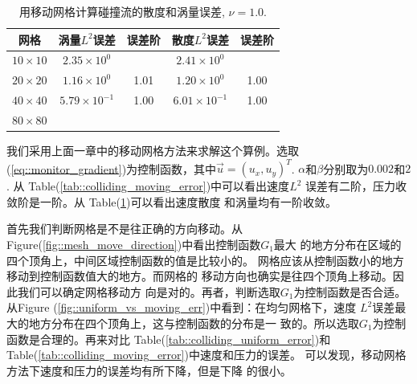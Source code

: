 \documentclass{report}
\theoremstyle{Remark}
\begin{document}
          \begin{table}[!htbp]
            \centering
            \begin{tabular}{ccccc} \toprule
              网格   & 涡量$L^2$误差 & 误差阶 & 散度$L^2$误差 & 误差阶\\ \midrule
              $10 \times 10$    &   $2.35 \times 10^{0}$   &  &   $2.41 \times
              10^0$ &  \\
              $20 \times 20 $   &   $1.16 \times 10^{0}$  & 1.01  &   $1.20 \times
              10^0$ & 1.00 \\
              $40 \times 40 $   &   $5.79 \times 10^{-1}$ & 1.00  &   $6.01 \times
              10^{-1}$ &  1.00 \\
              $80 \times 80 $   &  &   & &  \\ \bottomrule
            \end{tabular}
            \caption{\small 用移动网格计算碰撞流的散度和涡量误差, $\nu = 1.0$.}
            \label{tab::colliding_moving_div_error}
          \end{table}

          我们采用上面一章中的移动网格方法来求解这个算例。选取
          (\ref{eq::monitor_gradient})为控制函数，其中$\vec{u} = (u_x,
          u_y)^T$. $\alpha$和$\beta$分别取为$0.002$和$2$. 从
          Table(\ref{tab::colliding_moving_error})中可以看出速度$L^2$
          误差有二阶，压力收敛阶是一阶。从
          Table(\ref{tab::colliding_moving_div_error})可以看出速度散度
          和涡量均有一阶收敛。

          首先我们判断网格是不是往正确的方向移动。从
          Figure(\ref{fig::mesh_move_direction})中看出控制函数$G_1$最大
          的地方分布在区域的四个顶角上，中间区域控制函数的值是比较小的。
          网格应该从控制函数小的地方移动到控制函数值大的地方。而网格的
          移动方向也确实是往四个顶角上移动。因此我们可以确定网格移动方
          向是对的。再者，判断选取$G_1$为控制函数是否合适。从Figure
          (\ref{fig::uniform_vs_moving_err})中看到：在均匀网格下，速度
          $L^2$误差最大的地方分布在四个顶角上，这与控制函数的分布是一
          致的。所以选取$G_1$为控制函数是合理的。再来对比
          Table(\ref{tab::colliding_uniform_error})和
          Table(\ref{tab::colliding_moving_error})中速度和压力的误差。
          可以发现，移动网格方法下速度和压力的误差均有所下降，但是下降
          的很小。
\end{document}
